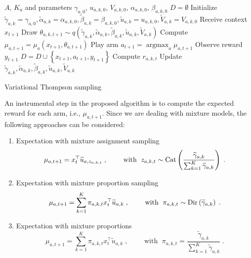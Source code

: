 \documentclass{article}
\newcommand{\ie}{i.e., }
\newcommand{\Dir}{{\rm Dir}}
\newcommand{\Cat}{{\rm Cat}}
\newcommand{\argmax}{\mathop{\mathrm{argmax}}}
\begin{document}
\begin{algorithm}
	\begin{algorithmic}
	\Require $A$, $K_a$ and parameters $\gamma_{a,0}$, $u_{a,k,0}$, $V_{a,k,0}$, $\alpha_{a,k,0}$, $\beta_{a,k,0}$
	\State $D=\emptyset$
	\State Initialize $\widetilde{\gamma}_{a,k}=\gamma_{a,0}, \widetilde{\alpha}_{a,k}=\alpha_{a,k,0}, \widetilde{\beta}_{a,k}=\beta_{a,k,0}, \widetilde{u}_{a,k}=u_{a,k,0}, \widetilde{V}_{a,k}=V_{a,k,0}$
		\State Receive context $x_{t+1}$
				\State Draw $\theta_{a,k,t+1} \sim q\left(\widetilde{\gamma}_{a,k}, \widetilde{\alpha}_{a,k}, \widetilde{\beta}_{a,k}, \widetilde{u}_{a,k}, \widetilde{V}_{a,k}\right)$
			\EndFor
			\State Compute $\mu_{a,t+1}=\mu_{a}(x_{t+1},\theta_{a,t+1})$
		\EndFor
		\State Play arm $a_{t+1}=\argmax_{a}\mu_{a,t+1}$
		\State Observe reward $y_{t+1}$
		\State $D=D \cup \left\{x_{t+1}, a_{t+1}, y_{t+1}\right\}$
			\State Compute $r_{a,k,t}$
			\State Update $\widetilde{\gamma}_{a,k}, \widetilde{\alpha}_{a,k}, \widetilde{\beta}_{a,k}, \widetilde{u}_{a,k}, \widetilde{V}_{a,k}$
		\EndWhile
	\EndFor
	\end{algorithmic}
	\caption{Variational Thompson sampling}
	\label{alg:vts}
\end{algorithm}

An instrumental step in the proposed algorithm is to compute the expected reward for each arm, \ie $\mu_{a,t+1}$. Since we are dealing with mixture models, the following approaches can be considered:
\begin{enumerate}
	\item Expectation with mixture assignment sampling
	\begin{equation}
	\mu_{a,t+1}=x_{t}^\top \widetilde{u}_{a,z_{a,k,t}} \;, \qquad \text{ with } \; z_{a,k,t} \sim \Cat \left(\frac{\widetilde{\gamma}_{a,k}}{\sum_{k=1}^{K}\widetilde{\gamma}_{a,k}} \right) \;.
	\end{equation}
	\item Expectation with mixture proportion sampling
	\begin{equation}
	\mu_{a,t+1}=\sum_{k=1}^K \pi_{a,k,t} x_{t}^\top \widetilde{u}_{a,k} \;, \qquad \text{ with } \; \pi_{a,k,t} \sim \Dir\left(\widetilde{\gamma}_{a,k} \right) \;.
	\end{equation}
	\item Expectation with mixture proportions
	\begin{equation}
	\mu_{a,t+1}=\sum_{k=1}^K \pi_{a,k,t} x_{t}^\top \widetilde{u}_{a,k} \;, \qquad \text{ with } \; \pi_{a,k,t} = \frac{\widetilde{\gamma}_{a,k}}{\sum_{k=1}^{K}\widetilde{\gamma}_{a,k}} \;.
	\end{equation}
\end{enumerate}
\end{document}

